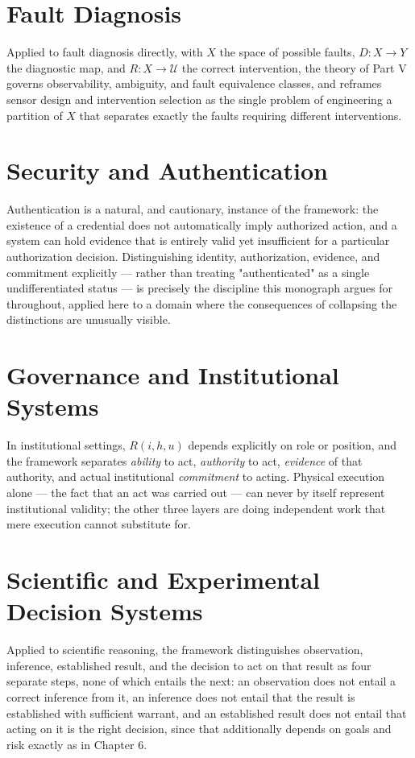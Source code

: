 \documentclass[11pt]{report}
\theoremstyle{definition}
\theoremstyle{plain}
\newcommand{\Uni}{\mathcal{U}}
\begin{document}
\chapter{Fault Diagnosis}

Applied to fault diagnosis directly, with $X$ the space of possible faults, $D: X \to Y$ the diagnostic map, and $R: X \to \Uni$ the correct intervention, the theory of Part V governs observability, ambiguity, and fault equivalence classes, and reframes sensor design and intervention selection as the single problem of engineering a partition of $X$ that separates exactly the faults requiring different interventions.

\chapter{Security and Authentication}

Authentication is a natural, and cautionary, instance of the framework: the existence of a credential does not automatically imply authorized action, and a system can hold evidence that is entirely valid yet insufficient for a particular authorization decision. Distinguishing identity, authorization, evidence, and commitment explicitly --- rather than treating "authenticated" as a single undifferentiated status --- is precisely the discipline this monograph argues for throughout, applied here to a domain where the consequences of collapsing the distinctions are unusually visible.

\chapter{Governance and Institutional Systems}

In institutional settings, $R(i,h,u)$ depends explicitly on role or position, and the framework separates \emph{ability} to act, \emph{authority} to act, \emph{evidence} of that authority, and actual institutional \emph{commitment} to acting. Physical execution alone --- the fact that an act was carried out --- can never by itself represent institutional validity; the other three layers are doing independent work that mere execution cannot substitute for.

\chapter{Scientific and Experimental Decision Systems}

Applied to scientific reasoning, the framework distinguishes observation, inference, established result, and the decision to act on that result as four separate steps, none of which entails the next: an observation does not entail a correct inference from it, an inference does not entail that the result is established with sufficient warrant, and an established result does not entail that acting on it is the right decision, since that additionally depends on goals and risk exactly as in Chapter 6.
\end{document}
